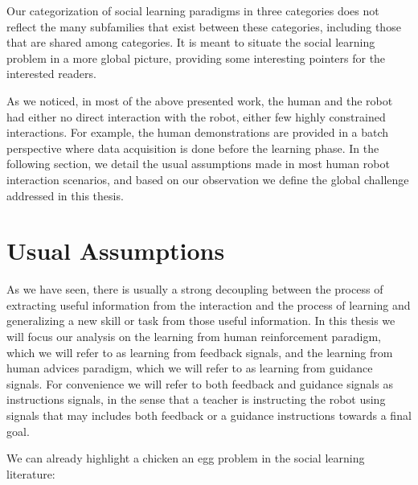 Our categorization of social learning paradigms in three categories does not reflect the many subfamilies that exist between these categories, including those that are shared among categories. It is meant to situate the social learning problem in a more global picture, providing some interesting pointers for the interested readers. 

As we noticed, in most of the above presented work, the human and the robot had either no direct interaction with the robot, either few highly constrained interactions. For example, the human demonstrations are provided in a batch perspective where data acquisition is done before the learning phase. In the following section, we detail the usual assumptions made in most human robot interaction scenarios, and based on our observation we define the global challenge addressed in this thesis.

\section{Usual Assumptions}

As we have seen, there is usually a strong decoupling between the process of extracting useful information from the interaction and the process of learning and generalizing a new skill or task from those useful information. In this thesis we will focus our analysis on the learning from human reinforcement paradigm, which we will refer to as learning from feedback signals, and the learning from human advices paradigm, which we will refer to as learning from guidance signals. For convenience we will refer to both feedback and guidance signals as instructions signals, in the sense that a teacher is instructing the robot using signals that may includes both feedback or a guidance instructions towards a final goal.

We can already highlight a chicken an egg problem in the social learning literature:

